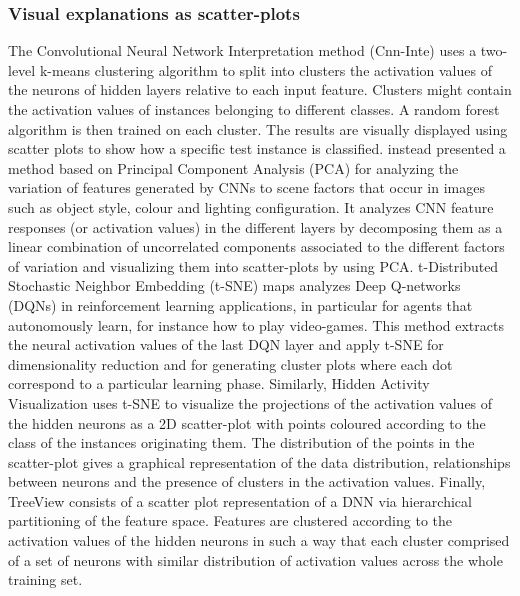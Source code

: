 \documentclass[final,1p,times]{elsarticle}
\begin{document}
\subsubsection{Visual explanations as scatter-plots}
The Convolutional Neural Network Interpretation method (Cnn-Inte) \cite{liu2018interpretable} uses a two-level k-means clustering algorithm to split into clusters the activation values of the neurons of hidden layers relative to each input feature. Clusters might contain the activation values of instances belonging to different classes. A random forest algorithm is then trained on each cluster. The results are visually displayed using scatter plots to show how a specific test instance is classified. \cite{aubry2015understanding} instead presented a method based on Principal Component Analysis (PCA) for analyzing the variation of features generated by CNNs to scene factors that occur in images such as object style, colour and lighting configuration. It analyzes CNN feature responses (or activation values) in the different layers by decomposing them as a linear combination of uncorrelated components associated to the different factors of variation and visualizing them into scatter-plots by using PCA.
t-Distributed Stochastic Neighbor Embedding (t-SNE) maps \cite{zahavy2016graying} analyzes Deep Q-networks (DQNs) in reinforcement learning applications, in particular for agents that autonomously learn, for instance how to play video-games. This method extracts the neural activation values of the last DQN layer and apply t-SNE for dimensionality reduction and for generating cluster plots where each dot correspond to a particular learning phase. Similarly, Hidden Activity Visualization \cite{rauber2017visualizing} uses t-SNE to visualize  the projections of the activation values of the hidden neurons as a 2D scatter-plot with points coloured according to the class of the instances originating them. The distribution of the points in the scatter-plot gives a graphical representation of the data distribution, relationships between neurons and the presence of clusters in the activation values.
Finally, TreeView \cite{thiagarajan2016treeview} consists of a scatter plot representation of a DNN via hierarchical partitioning of the feature space. Features are clustered according to the activation values of the hidden neurons in such a way that each cluster comprised of a set of neurons with similar distribution of activation values across the whole training set.
\end{document}
